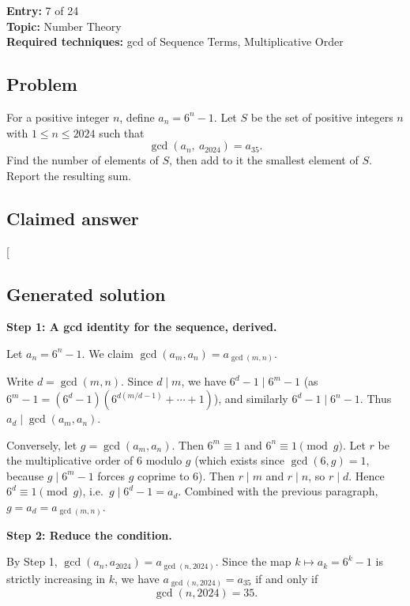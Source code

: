 \documentclass[
  11pt,
  letterpaper,
]{article}
\begin{document}
\textbf{Entry:} 7 of 24\\
\textbf{Topic:} Number Theory\\
\textbf{Required techniques:} gcd of Sequence Terms, Multiplicative
Order

\subsection{Problem}\label{problem-6}

For a positive integer \(n\), define \(a_n = 6^n - 1\). Let \(S\) be the
set of positive integers \(n\) with \(1 \le n \le 2024\) such that
\[\gcd(a_n,\ a_{2024}) = a_{35}.\] Find the number of elements of \(S\),
then add to it the smallest element of \(S\). Report the resulting sum.

\subsection{Claimed answer}\label{claimed-answer-6}

{[}\boxed{93}{]}

\subsection{Generated solution}\label{generated-solution-6}

\textbf{Step 1: A gcd identity for the sequence, derived.}

Let \(a_n = 6^n - 1\). We claim \(\gcd(a_m, a_n) = a_{\gcd(m,n)}\).

Write \(d = \gcd(m,n)\). Since \(d \mid m\), we have
\(6^d - 1 \mid 6^m - 1\) (as
\(6^m - 1 = (6^d - 1)(6^{d(m/d-1)} + \cdots + 1)\)), and similarly
\(6^d - 1 \mid 6^n - 1\). Thus \(a_d \mid \gcd(a_m, a_n)\).

Conversely, let \(g = \gcd(a_m, a_n)\). Then \(6^m \equiv 1\) and
\(6^n \equiv 1 \pmod g\). Let \(r\) be the multiplicative order of \(6\)
modulo \(g\) (which exists since \(\gcd(6,g)=1\), because
\(g \mid 6^m-1\) forces \(g\) coprime to \(6\)). Then \(r \mid m\) and
\(r \mid n\), so \(r \mid d\). Hence \(6^d \equiv 1 \pmod g\),
i.e.~\(g \mid 6^d - 1 = a_d\). Combined with the previous paragraph,
\(g = a_d = a_{\gcd(m,n)}\).

\textbf{Step 2: Reduce the condition.}

By Step 1, \(\gcd(a_n, a_{2024}) = a_{\gcd(n, 2024)}\). Since the map
\(k \mapsto a_k = 6^k - 1\) is strictly increasing in \(k\), we have
\(a_{\gcd(n,2024)} = a_{35}\) if and only if \[\gcd(n, 2024) = 35.\]
\end{document}
